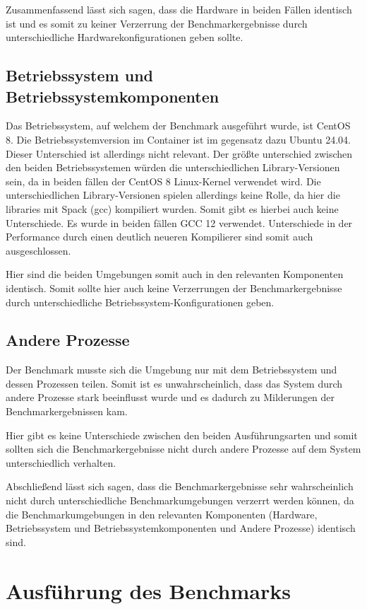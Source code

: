 Zusammenfassend lässt sich sagen, dass die Hardware in beiden Fällen identisch ist und es somit zu keiner Verzerrung der Benchmarkergebnisse durch unterschiedliche Hardwarekonfigurationen geben sollte. 

\subsection{Betriebssystem und Betriebssystemkomponenten}

Das Betriebssystem, auf welchem der Benchmark ausgeführt wurde, ist CentOS 8. Die Betriebssystemversion im Container ist im gegensatz dazu Ubuntu 24.04. Dieser Unterschied ist allerdings nicht relevant. Der größte unterschied zwischen den beiden Betriebssystemen würden die unterschiedlichen Library-Versionen sein, da in beiden fällen der CentOS 8 Linux-Kernel verwendet wird. Die unterschiedlichen Library-Versionen spielen allerdings keine Rolle, da hier die libraries mit Spack (gcc) kompiliert wurden. Somit gibt es hierbei auch keine Unterschiede. Es wurde in beiden fällen GCC 12 verwendet. Unterschiede in der Performance durch einen deutlich neueren Kompilierer sind somit auch ausgeschlossen. 

Hier sind die beiden Umgebungen somit auch in den relevanten Komponenten identisch. Somit sollte hier auch keine Verzerrungen der Benchmarkergebnisse durch unterschiedliche Betriebssystem-Konfigurationen geben.

\subsection{Andere Prozesse}

Der Benchmark musste sich die Umgebung nur mit dem Betriebssystem und dessen Prozessen teilen. Somit ist es unwahrscheinlich, dass das System durch andere Prozesse stark beeinflusst wurde und es dadurch zu Milderungen der Benchmarkergebnissen kam.

Hier gibt es keine Unterschiede zwischen den beiden Ausführungsarten und somit sollten sich die Benchmarkergebnisse nicht durch andere Prozesse auf dem System unterschiedlich verhalten.


Abschließend lässt sich sagen, dass die Benchmarkergebnisse sehr wahrscheinlich nicht durch unterschiedliche Benchmarkumgebungen verzerrt werden können, da die Benchmarkumgebungen in den relevanten Komponenten (Hardware, Betriebssystem und Betriebssystemkomponenten und Andere Prozesse) identisch sind.   

\section{Ausführung des Benchmarks}

